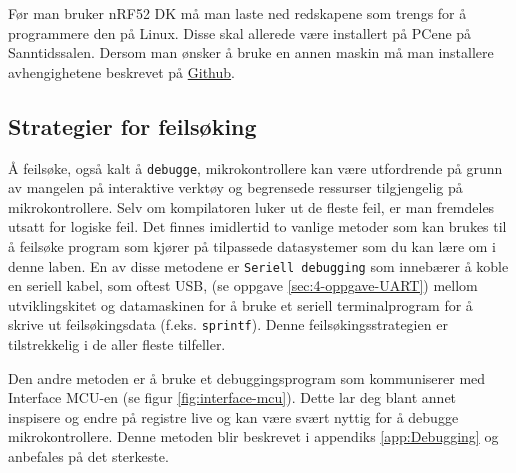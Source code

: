 \begin{alphasection}
Før man bruker nRF52 DK må man laste ned redskapene som trengs for å programmere den på Linux. Disse skal allerede være installert på PCene på Sanntidssalen. Dersom man ønsker å bruke en annen maskin må man installere avhengighetene beskrevet på \href{https://github.com/ITK-TTK4235/nrf52dk-environment}{Github}.



\subsection{Strategier for feilsøking}

Å feilsøke, også kalt å \verb|debugge|, mikrokontrollere kan være utfordrende på grunn av mangelen på interaktive verktøy og begrensede ressurser tilgjengelig på mikrokontrollere. Selv om kompilatoren luker ut de fleste feil, er man fremdeles utsatt for logiske feil. Det finnes imidlertid to vanlige metoder som kan brukes til å feilsøke program som kjører på tilpassede datasystemer som du kan lære om i denne laben. En av disse metodene er \verb|Seriell debugging| som innebærer å koble en seriell kabel, som oftest USB, (se oppgave \ref{sec:4-oppgave-UART}) mellom utviklingskitet og datamaskinen for å bruke et seriell terminalprogram for å skrive ut feilsøkingsdata (f.eks. \verb|sprintf|). Denne feilsøkingsstrategien er tilstrekkelig i de aller fleste tilfeller. 

Den andre metoden er å bruke et debuggingsprogram som kommuniserer med Interface MCU-en (se figur \ref{fig:interface-mcu}). Dette lar deg blant annet inspisere og endre på registre live og kan være svært nyttig for å debugge mikrokontrollere. Denne metoden blir beskrevet i appendiks \ref{app:Debugging} og anbefales på det sterkeste.


\end{alphasection}



\setcounter{section}{0}
